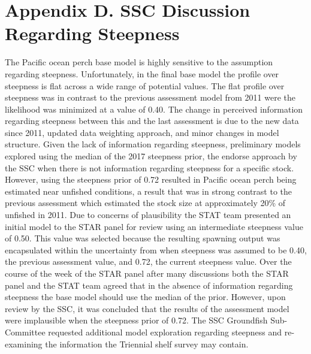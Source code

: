 \documentclass[12pt,]{article}
\begin{document}
\FloatBarrier

\newpage

\section{Appendix D. SSC Discussion Regarding
Steepness}\label{appendix-d.-ssc-discussion-regarding-steepness}

The Pacific ocean perch base model is highly sensitive to the assumption
regarding steepness. Unfortunately, in the final base model the profile
over steepness is flat across a wide range of potential values. The flat
profile over steepness was in contrast to the previous assessment model
from 2011 were the likelihood was minimized at a value of 0.40. The
change in perceived information regarding steepness between this and the
last assessment is due to the new data since 2011, updated data
weighting approach, and minor changes in model structure. Given the lack
of information regarding steepness, preliminary models explored using
the median of the 2017 steepness prior, the endorse approach by the SSC
when there is not information regarding steepness for a specific stock.
However, using the steepness prior of 0.72 resulted in Pacific ocean
perch being estimated near unfished conditions, a result that was in
strong contrast to the previous assessment which estimated the stock
size at approximately 20\% of unfished in 2011. Due to concerns of
plausibility the STAT team presented an initial model to the STAR panel
for review using an intermediate steepness value of 0.50. This value was
selected because the resulting spawning output was encapsulated within
the uncertainty from when steepness was assumed to be 0.40, the previous
assessment value, and 0.72, the current steepness value. Over the course
of the week of the STAR panel after many discussions both the STAR panel
and the STAT team agreed that in the absence of information regarding
steepness the base model should use the median of the prior. However,
upon review by the SSC, it was concluded that the results of the
assessment model were implausible when the steepness prior of 0.72. The
SSC Groundfish Sub-Committee requested additional model exploration
regarding steepness and re-examining the information the Triennial shelf
survey may contain.
\end{document}
